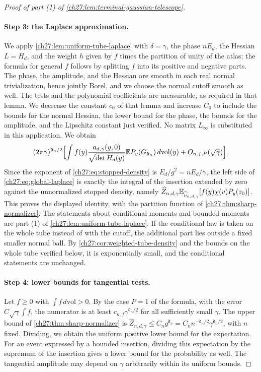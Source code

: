 \begin{proof}[Proof of part (1) of \cref{ch27:lem:terminal-gaussian-telescope}]
\paragraph{Step 3: the Laplace approximation.}
We apply \cref{ch27:lem:uniform-tube-laplace} with $\delta=\gamma$, the phase $nE_d$, the Hessian $L=H_d$, and the weight $h$ given by $f$ times the partition of unity of the atlas; the formula for general $f$ follows by splitting $f$ into its positive and negative parts. The phase, the amplitude, and the Hessian are smooth in each real normal trivialization, hence jointly Borel, and we choose the normal cutoff smooth as well. The tests and the polynomial coefficients are measurable, as required in that lemma. We decrease the constant $c_0$ of that lemma and increase $C_0$ to include the bounds for the normal Hessian, the lower bound for the phase, the bounds for the amplitude, and the Lipschitz constant just verified. No matrix $L_\infty$ is substituted in this application. We obtain
\[
 (2\pi\gamma)^{\mathfrak d_n/2}\Bigl[\int f(y)\frac{a_{d,\gamma}(y,0)}{\sqrt{\det H_d(y)}}\mathbb E P_y(G_{\mathfrak d_n})\,d\mathrm{vol}(y)+O_{n,f,P}(\sqrt\gamma)\Bigr].
\]
Since the exponent of \eqref{ch27:eq:stopped-density} is $E_d/g^2=nE_d/\gamma$, the left side of \eqref{ch27:eq:global-laplace} is exactly the integral of the insertion extended by zero against the unnormalized stopped density, namely $\widehat Z_{n,d,\gamma}\mathbb E_{\widehat\nu_{n,d,\gamma}}[f(y)\chi(v)P_y(z_0)]$. This proves the displayed identity, with the partition function of \cref{ch27:thm:sharp-normalizer}. The statements about conditional moments and bounded moments are part (1) of \cref{ch27:lem:uniform-tube-laplace}. If the conditional law is taken on the whole tube instead of with the cutoff, the additional part lies outside a fixed smaller normal ball. By \cref{ch27:cor:weighted-tube-density} and the bounds on the whole tube verified below, it is exponentially small, and the conditional statements are unchanged.

\paragraph{Step 4: lower bounds for tangential tests.}
Let $f\ge0$ with $\int f\,d\mathrm{vol}>0$. By the case $P=1$ of the formula, with the error $C\sqrt\gamma\int f$, the numerator is at least $c_{n,f}\gamma^{\mathfrak d_n/2}$ for all sufficiently small $\gamma$. The upper bound of \cref{ch27:thm:sharp-normalizer} is $\widehat Z_{n,d,\gamma}\le C_ng^{\mathfrak d_n}=C_nn^{-\mathfrak d_n/2}\gamma^{\mathfrak d_n/2}$, with $n$ fixed. Dividing, we obtain the uniform positive lower bound for the expectation. For an event expressed by a bounded insertion, dividing this expectation by the supremum of the insertion gives a lower bound for the probability as well. The tangential amplitude may depend on $\gamma$ arbitrarily within its uniform bounds.
\end{proof}


